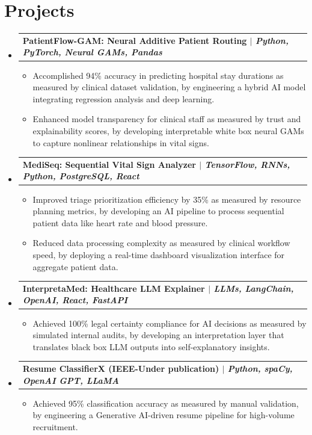 \documentclass[10pt,a4paper]{article}
\makeatletter
\newcommand{\resumeItem}[1]{\item\small{#1}}
\newcommand{\resumeProjectHeading}[2]{
  \vspace{-1pt}\item
    \begin{tabular*}{1.0\textwidth}[t]{l@{\extracolsep{\fill}}r}
      \textbf{#1} & #2 \\
    \end{tabular*}\vspace{-5pt}
}
\makeatother
\begin{document}
\section{Projects}
\begin{itemize}[leftmargin=0.15in, label={}]
    \resumeProjectHeading
      {\textbf{PatientFlow-GAM: Neural Additive Patient Routing} $|$ \emph{Python, PyTorch, Neural GAMs, Pandas}}{}
      \begin{itemize}[leftmargin=0.15in, label={\textbullet}]
        \resumeItem{Accomplished 94\% accuracy in predicting hospital stay durations as measured by clinical dataset validation, by engineering a hybrid AI model integrating regression analysis and deep learning.}
        \resumeItem{Enhanced model transparency for clinical staff as measured by trust and explainability scores, by developing interpretable white box neural GAMs to capture nonlinear relationships in vital signs.}
      \end{itemize}
    \resumeProjectHeading
      {\textbf{MediSeq: Sequential Vital Sign Analyzer} $|$ \emph{TensorFlow, RNNs, Python, PostgreSQL, React}}{}
      \begin{itemize}[leftmargin=0.15in, label={\textbullet}]
        \resumeItem{Improved triage prioritization efficiency by 35\% as measured by resource planning metrics, by developing an AI pipeline to process sequential patient data like heart rate and blood pressure.}
        \resumeItem{Reduced data processing complexity as measured by clinical workflow speed, by deploying a real-time dashboard visualization interface for aggregate patient data.}
      \end{itemize}
    \resumeProjectHeading
      {\textbf{InterpretaMed: Healthcare LLM Explainer} $|$ \emph{LLMs, LangChain, OpenAI, React, FastAPI}}{}
      \begin{itemize}[leftmargin=0.15in, label={\textbullet}]
        \resumeItem{Achieved 100\% legal certainty compliance for AI decisions as measured by simulated internal audits, by developing an interpretation layer that translates black box LLM outputs into self-explanatory insights.}
      \end{itemize}
    \resumeProjectHeading
      {\textbf{Resume ClassifierX (IEEE-Under publication)} $|$ \emph{Python, spaCy, OpenAI GPT, LLaMA}}{}
      \begin{itemize}[leftmargin=0.15in, label={\textbullet}]
        \resumeItem{Achieved 95\% classification accuracy as measured by manual validation, by engineering a Generative AI-driven resume pipeline for high-volume recruitment.}

\end{itemize}
\end{itemize}
\end{document}
